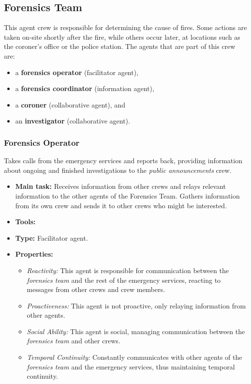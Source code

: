 \subsection{Forensics Team}
This agent crew is responsible for determining the cause of fires. Some actions are taken on-site shortly after the fire, while others occur later, at locations such as the coroner's office or the police station. The agents that are part of this crew are:
\begin{itemize}
    \item a \textbf{forensics operator} (facilitator agent),
    \item a \textbf{forensics coordinator} (information agent),
    \item a \textbf{coroner} (collaborative agent), and
    \item an \textbf{investigator} (collaborative agent).
\end{itemize}

\subsubsection{Forensics Operator}
Takes calls from the emergency services and reports back, providing information about ongoing and finished investigations to the \textit{public announcements} crew.
\begin{itemize}
    \item \textbf{Main task:} Receives information from other crews and relays relevant information to the other agents of the Forensics Team. Gathers information from its own crew and sends it to other crews who might be interested.
    \item \textbf{Tools:}
    \item \textbf{Type:} Facilitator agent.
    \item \textbf{Properties:}
    \begin{itemize}
        \item \textit{Reactivity:} This agent is responsible for communication between the \textit{forensics team} and the rest of the emergency services, reacting to messages from other crews and crew members.
        \item \textit{Proactiveness:} This agent is not proactive, only relaying information from other agents.
        \item \textit{Social Ability:} This agent is social, managing communication between the \textit{forensics team} and other crews.
        \item \textit{Temporal Continuity:} Constantly communicates with other agents of the \textit{forensics team} and the emergency services, thus maintaining temporal continuity.
    \end{itemize}
\end{itemize}

